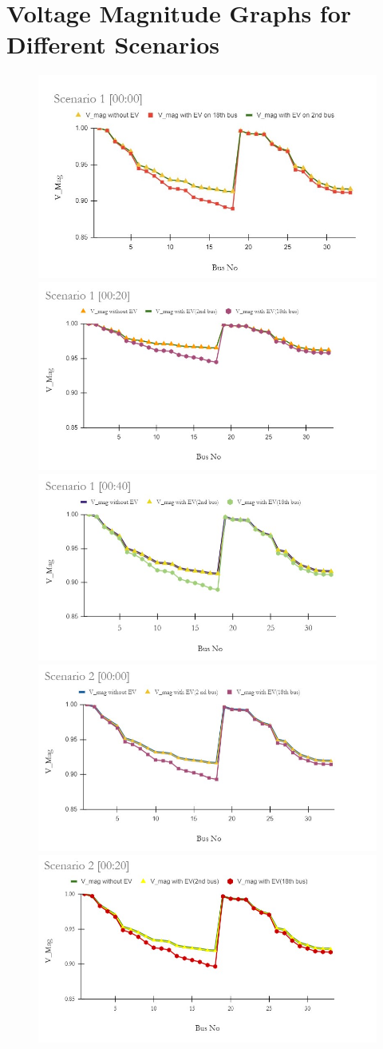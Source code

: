 	
	\section{Voltage Magnitude Graphs for Different Scenarios}
	\begin{figure}[h]
	\includegraphics[width=0.55\linewidth]{./Figures/sc 1 (00_00)}
	\includegraphics[width=0.55\linewidth]{./Figures/sc 1 (00_20)}
	\includegraphics[width=0.55\linewidth]{./Figures/sc 1 (00_40)}
	\includegraphics[width=0.55\linewidth]{./Figures/sc 2 (00_00)}
	\includegraphics[width=0.55\linewidth]{./Figures/sc 2 (00_20)}

\end{figure}
